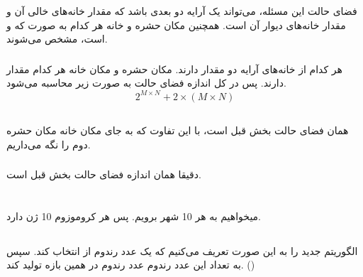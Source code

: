 \documentclass{university}
\begin{document}
\setupdocument

\section{}
\subsection{}
\subsubsection{}
فضای حالت این مسئله، می‌تواند یک آرایه دو بعدی 
باشد که مقدار خانه‌های خالی آن 
و مقدار خانه‌های دیوار آن 
است. همچنین مکان حشره و خانه 
هر کدام به صورت 
که 
و
است، مشخص می‌شوند. 

\subsubsection{}
هر کدام از خانه‌های آرایه دو مقدار دارند.
مکان حشره و مکان خانه
هر کدام 
مقدار دارند. پس در کل اندازه فضای حالت به صورت زیر محاسبه می‌شود. 
$$
2^{M \times N} + 2 \times (M \times N)
$$

\subsection{}
\subsubsection{}
همان فضای حالت بخش قبل است، با این تفاوت که به جای مکان خانه 
مکان حشره دوم را نگه می‌داریم.

\subsubsection{}
دقیقا همان اندازه فضای حالت بخش قبل است.

\section{}
\subsection{}
میخواهیم به هر 10 شهر برویم. پس هر کروموزوم 10 ژن دارد.

\subsection{}
الگوریتم 
جدید را به این صورت تعریف می‌کنیم که یک عدد رندوم از 
\lr{$[0, 9]$}
انتخاب کند. سپس به تعداد این عدد رندوم عدد رندوم در همین بازه تولید کند. 
()
\end{document}
